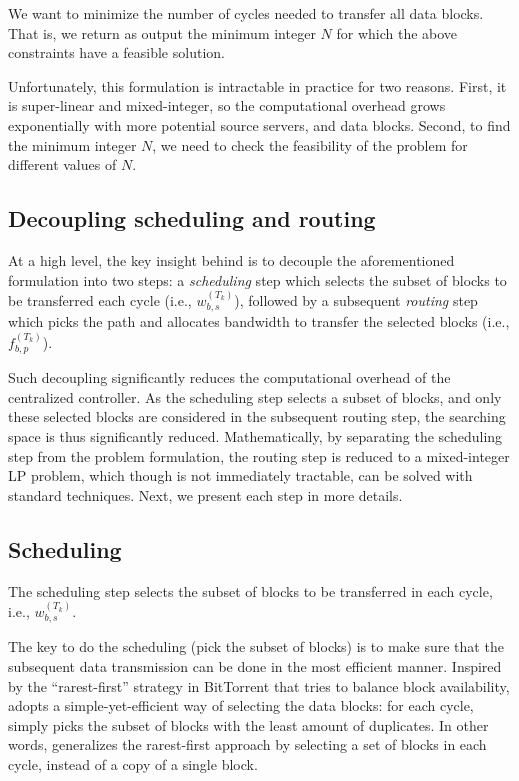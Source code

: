  We want to minimize the number of cycles needed to
transfer all data blocks. That is, we return as output the minimum
integer $N$ for which the above constraints have a feasible solution.

Unfortunately, this formulation is intractable in practice for two
reasons. First, it is super-linear and mixed-integer, so the
computational overhead grows exponentially with more potential source
servers, and data blocks. Second, to find the minimum integer $N$, we
need to check the feasibility of the problem for different values of
$N$.

\subsection{Decoupling scheduling and routing}
\label{subsec:logic:separation}

At a high level, the key insight behind \name is to decouple the
aforementioned formulation into two steps: a {\em scheduling} step
which selects the subset of blocks to be transferred each cycle
(i.e., $w^{(T_k)}_{b,s}$), followed by a subsequent {\em routing}
step which picks the path and allocates bandwidth to transfer the
selected blocks (i.e.,
$f_{b,p}^{(T_k)}$).

Such decoupling significantly reduces the computational overhead of
the centralized controller. As the scheduling step selects a subset
of blocks, and only these selected blocks are considered in the
subsequent routing step, the searching space is thus significantly
reduced. Mathematically, by separating the scheduling step from the
problem formulation, the routing step is reduced to a mixed-integer
LP problem, which though is not immediately tractable, can be solved
with standard techniques. Next, we present each step in more details.

\subsection{Scheduling}
\label{subsec:logic:scheduling}

The scheduling step selects the subset of blocks to be transferred in
each cycle, i.e., $w^{(T_k)}_{b,s}$.

The key to do the scheduling (pick the subset of blocks) is to make sure that the subsequent data transmission can be done in the most efficient manner. Inspired by the ``rarest-first'' strategy in BitTorrent \cite{Cohen2003Incentives} that tries to balance block availability, \name adopts a simple-yet-efficient way of selecting the data blocks: for each cycle, \name simply picks the subset of blocks with the least amount of duplicates. In other words, \name generalizes the rarest-first approach by selecting a set of blocks in each cycle, instead of a copy of a single block.

